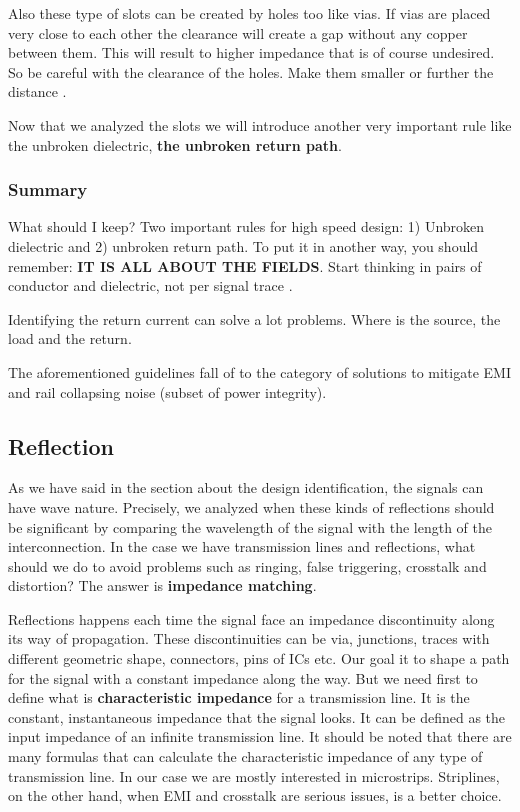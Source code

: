 \documentclass[final]{cubedoc}
\begin{document}
	Also these type of slots can be created by holes too like vias. If vias are placed very close to each other the clearance will create a gap without any copper between them. This will result to higher impedance that is of course undesired. So be careful with the clearance of the holes. Make them smaller or further the distance \cite{instruments2006high}.
	
	Now that we analyzed the slots we will introduce another very important rule like the unbroken dielectric, \textbf{the unbroken return path}.
	
	
	\subsubsection{Summary}
	
	What should I keep? Two important rules for high speed design: 1) Unbroken dielectric and 2) unbroken return path.
	To put it in another way, you should remember: \textbf{IT IS ALL ABOUT THE FIELDS}. Start thinking in pairs of conductor and dielectric, not per signal trace \cite{morrison2002fields}.
	
	Identifying the return current can solve a lot problems. Where is the source, the load and the return.
	
	
	The aforementioned guidelines fall of to the category of solutions to mitigate EMI and rail collapsing noise (subset of power integrity).
	
	\subsection{Reflection}
	
	As we have said in the section about the design identification, the signals can have wave nature. Precisely, we analyzed when these kinds of reflections should be significant by comparing the wavelength of the signal with the length of the interconnection. In the case we have transmission lines and reflections, what should we do to avoid problems such as ringing, false triggering, crosstalk and distortion? The answer is \textbf{impedance matching}.
	
	Reflections happens each time the signal face an impedance discontinuity along its way of propagation. These discontinuities can be via, junctions, traces with different geometric shape, connectors, pins of ICs etc. Our goal it to shape a path for the signal with a constant impedance along the way. But we need first to define what is \textbf{characteristic impedance} for a transmission line. It is the constant, instantaneous impedance that the signal looks. It can be defined as the input impedance of an infinite transmission line. It should be noted that there are many formulas that can calculate the characteristic impedance of any type of transmission line. In our case we are mostly interested in microstrips. Striplines, on the other hand, when EMI and crosstalk are serious issues, is a better choice.
	
\end{document}
